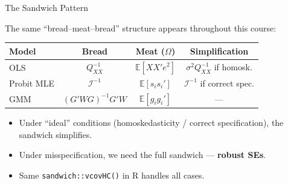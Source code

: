\documentclass[aspectratio=169, handout, t]{beamer}
\numberwithin{equation}{section}
\begin{document}
\begin{frame}{The Sandwich Pattern}

The same ``bread--meat--bread'' structure appears throughout this course:

\medskip

\renewcommand{\arraystretch}{1.5}
\begin{tabular}{lccc}
\toprule
\textbf{Model} & \textbf{Bread} & \textbf{Meat} ($\Omega$) & \textbf{Simplification} \\
\midrule
OLS & $Q_{XX}^{-1}$ & $\mathbb{E}[XX'e^2]$ & $\sigma^2 Q_{XX}^{-1}$ if homosk. \\
Probit MLE & $\mathcal{I}^{-1}$ & $\mathbb{E}[s_i s_i']$ & $\mathcal{I}^{-1}$ if correct spec. \\
GMM & $(G'WG)^{-1}G'W$ & $\mathbb{E}[g_i g_i']$ & --- \\
\bottomrule
\end{tabular}
\renewcommand{\arraystretch}{1.0}

\pause

\bigskip

\begin{itemize}
    \item Under ``ideal'' conditions (homoskedasticity / correct specification), the sandwich simplifies.
    \item Under misspecification, we need the full sandwich --- \textbf{robust SEs}.
    \item Same \texttt{sandwich::vcovHC()} in R handles all cases.
\end{itemize}

\end{frame}

\end{document}
